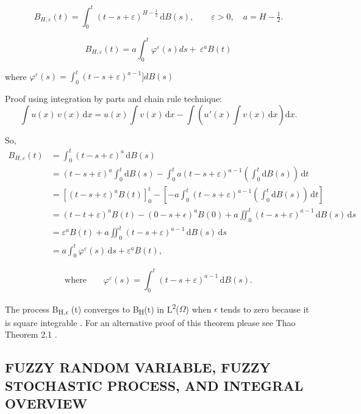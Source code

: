 \documentclass[12pt,a4paper]{report}
\numberwithin{equation}{section}
\begin{document}
\begin{equation}\label{eq:5.1.2}
B_{H,\varepsilon}(t)
= \int_{0}^{t} (t-s+\varepsilon)^{H-\frac12}\,\mathrm{d}B(s),
\qquad \varepsilon>0,\quad a = H-\tfrac12.
\end{equation}


\[B_{H,\varepsilon}(t) = a\int_{0}^{t}{\varphi^{\varepsilon}(s)ds + \ \varepsilon^{a}B(t)}\]

where
\(\varphi^{\varepsilon}(s) = \int_{0}^{t}{(t - s + \varepsilon)^{a - 1}\rbrack dB(s)}\)

Proof using integration by parts and chain rule technique:
\[
\int u(x)\,v(x)\,\mathrm{d}x
= u(x)\int v(x)\,\mathrm{d}x
- \int\left(u'(x)\int v(x)\,\mathrm{d}x\right)\mathrm{d}x .
\]


So,
\begin{align*}
B_{H,\varepsilon}(t)
&= \int_{0}^{t} (t-s+\varepsilon)^{a}\,\mathrm{d}B(s) \\
&= (t-s+\varepsilon)^{a}\int_{0}^{t}\mathrm{d}B(s)
   - \int_{0}^{t} a(t-s+\varepsilon)^{a-1}\left(\int_{0}^{t}\mathrm{d}B(s)\right)\,\mathrm{d}t \\
&= \left[(t-s+\varepsilon)^{a}B(t)\right]_{0}^{t}
   - \left[-a\int_{0}^{t}(t-s+\varepsilon)^{a-1}\left(\int_{0}^{t}\mathrm{d}B(s)\right)\,\mathrm{d}t\right] \\
&= (t-t+\varepsilon)^{a}B(t) - (0-s+\epsilon)^{a}B(0)
   + a\iint_{0}^{t}(t-s+\varepsilon)^{a-1}\,\mathrm{d}B(s)\,\mathrm{d}s \\
&= \varepsilon^{a}B(t)
   + a\iint_{0}^{t}(t-s+\varepsilon)^{a-1}\,\mathrm{d}B(s)\,\mathrm{d}s \\
&= a\int_{0}^{t}\varphi^{\varepsilon}(s)\,\mathrm{d}s + \varepsilon^{a}B(t),
\end{align*}

\[
\text{where}\qquad
\varphi^{\varepsilon}(s)=\int_{0}^{t}(t-s+\varepsilon)^{a-1}\,\mathrm{d}B(s).
\]

The process B\textsubscript{H,$\epsilon$} (t) converges to B\textsubscript{H}(t)
in L\textsuperscript{2}($\Omega$) when $\epsilon$ tends to zero because it is square
integrable \cite{thao2006approximate_80}. For an alternative proof of this theorem please see
Thao Theorem 2.1 \cite{thao2006approximate_80}.

\hypertarget{fuzzy--random--variable--fuzzy--stochastic--process--and--integral--overview}{%
\subsection{FUZZY RANDOM VARIABLE, FUZZY STOCHASTIC PROCESS, AND
INTEGRAL
OVERVIEW}\label{fuzzy--random--variable--fuzzy--stochastic--process--and--integral--overview}}
\end{document}
